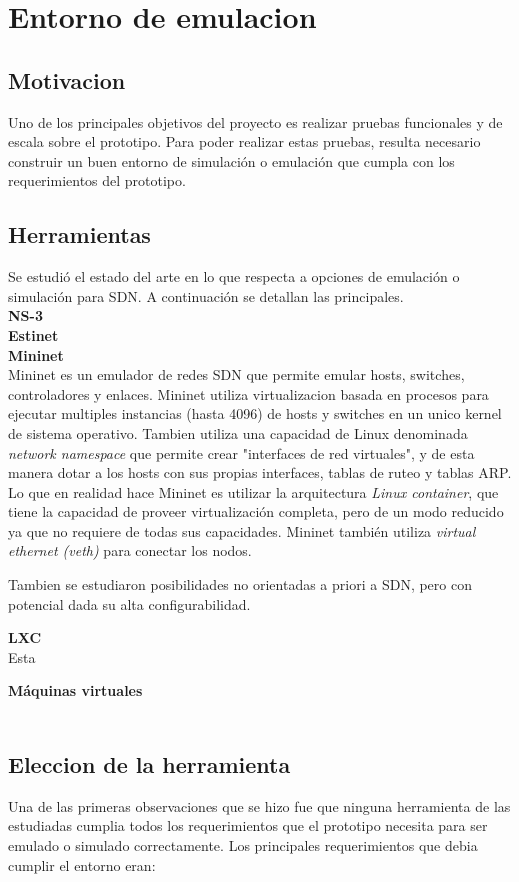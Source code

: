 \documentclass[a4paper,12pt]{report}
\begin{document}
\tableofcontents
\chapter{Entorno de emulacion}
\section{Motivacion}
Uno de los principales objetivos del proyecto es realizar pruebas funcionales y de escala sobre el prototipo. Para poder realizar estas pruebas, resulta necesario construir un buen entorno de simulación o emulación que cumpla con los requerimientos del prototipo.

\section{Herramientas}
Se estudió el estado del arte en lo que respecta a opciones de emulación o simulación para SDN. A continuación se detallan las principales.\\

\textbf{NS-3}\\

\textbf{Estinet}\\

\textbf{Mininet}\\
Mininet es un emulador de redes SDN que permite emular hosts, switches, controladores y enlaces. Mininet utiliza virtualizacion basada en procesos para ejecutar multiples instancias (hasta 4096) de hosts y switches en un unico kernel de sistema operativo. Tambien utiliza una capacidad de Linux denominada \textit{network namespace} que permite crear "interfaces de red virtuales", y de esta manera dotar a los hosts con sus propias interfaces, tablas de ruteo y tablas ARP. Lo que en realidad hace Mininet es utilizar la arquitectura \textit{Linux container}, que tiene la capacidad de proveer virtualización completa, pero de un modo reducido ya que no requiere de todas sus capacidades. Mininet también utiliza \textit{virtual ethernet (veth)} para conectar los nodos.

Tambien se estudiaron posibilidades no orientadas a priori a SDN, pero con potencial dada su alta configurabilidad.

\textbf{LXC}\\
Esta

\textbf{Máquinas virtuales}\\
\\

\section{Eleccion de la herramienta}
Una de las primeras observaciones que se hizo fue que ninguna herramienta de las estudiadas cumplia todos los requerimientos que el prototipo necesita para ser emulado o simulado correctamente. Los principales requerimientos que debia cumplir el entorno eran:
\end{document}
